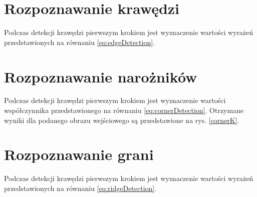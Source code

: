 \section{Rozpoznawanie krawędzi}
\label{sec:dzialanieEdge}

Podczas detekcji krawędzi pierwszym krokiem jest wyznaczenie wartości wyrażeń przedstawionych na równaniu \ref{eq:edgeDetection}.

\section{Rozpoznawanie narożników}
\label{sec:dzialanieCorner}

Podczas detekcji krawędzi pierwszym krokiem jest wyznaczenie wartości współczynnika przedstawionego na równaniu \ref{eq:cornerDetection}. Otrzymane wyniki dla podanego obrazu wejściowego są przedstawione na rys. \ref{cornerK}.

\section{Rozpoznawanie grani}
\label{sec:dzialanieRidge}

Podczas detekcji krawędzi pierwszym krokiem jest wyznaczenie wartości wyrażeń przedstawionych na równaniu \ref{eq:ridgeDetection}. 
